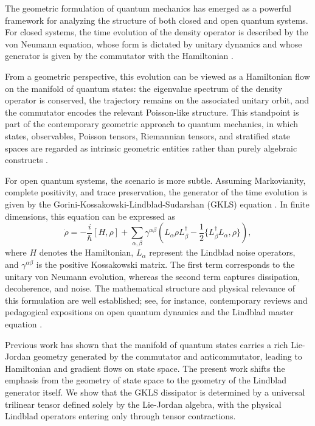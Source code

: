 \documentclass[notitlepage,aip,reprint,onecolumn]{revtex4-1}
\theoremstyle{definition}
\begin{document}
The geometric formulation of quantum mechanics has emerged as a powerful framework for analyzing the structure of both closed and open quantum systems. For closed systems, the time evolution of the density operator is described by the von Neumann equation, whose form is dictated by unitary dynamics and whose generator is given by the commutator with the Hamiltonian \cite{vonNeumann1971}.

From a geometric perspective, this evolution can be viewed as a Hamiltonian flow on the manifold of quantum states: the eigenvalue spectrum of the density operator is conserved, the trajectory remains on the associated unitary orbit, and the commutator encodes the relevant Poisson-like structure. This standpoint is part of the contemporary geometric approach to quantum mechanics, in which states, observables, Poisson tensors, Riemannian tensors, and stratified state spaces are regarded as intrinsic geometric entities rather than purely algebraic constructs \cite{Ashtekar:1997ud,Grabowski:2005my,BengtssonZyczkowski2017}.

For open quantum systems, the scenario is more subtle. Assuming Markovianity, complete positivity, and trace preservation, the generator of the time evolution is given by the Gorini-Kossakowski-Lindblad-Sudarshan (GKLS) equation \cite{Kossakowski:1972sbn,Gorini:1975nb,Lindblad:1975ef}. In finite dimensions, this equation can be expressed as
\begin{equation}\label{eq:intro-GKLS}
    \dot\rho
    =
    -\frac{i}{\hbar}[H,\rho]
    +
    \sum_{\alpha,\beta}
    \gamma^{\alpha\beta}
    \left(
    L_\alpha\rho L_\beta^\dagger
    -\frac12\{L_\beta^\dagger L_\alpha,\rho\}
    \right),
\end{equation}
where \(H\) denotes the Hamiltonian, \(L_\alpha\) represent the Lindblad noise operators, and \(\gamma^{\alpha\beta}\) is the positive Kossakowski matrix. The first term corresponds to the unitary von Neumann evolution, whereas the second term captures dissipation, decoherence, and noise. The mathematical structure and physical relevance of this formulation are well established; see, for instance, contemporary reviews and pedagogical expositions on open quantum dynamics and the Lindblad master equation \cite{Breuer:2015zlm,Lidar:2019qog,Manzano:2020yyw}.

Previous work has shown that the manifold of quantum states carries a rich Lie-Jordan geometry generated by the commutator and anticommutator, leading to Hamiltonian and gradient flows on state space. The present work shifts the emphasis from the geometry of state space to the geometry of the Lindblad generator itself. We show that the GKLS dissipator is determined by a universal trilinear tensor defined solely by the Lie-Jordan algebra, with the physical Lindblad operators entering only through tensor contractions.
\end{document}
